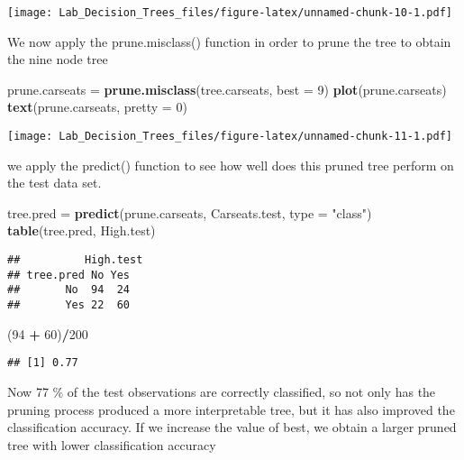 \documentclass[]{article}
\newenvironment{Shaded}{\begin{snugshade}}{\end{snugshade}}
\newcommand{\KeywordTok}[1]{\textcolor[rgb]{0.13,0.29,0.53}{\textbf{#1}}}
\newcommand{\DataTypeTok}[1]{\textcolor[rgb]{0.13,0.29,0.53}{#1}}
\newcommand{\DecValTok}[1]{\textcolor[rgb]{0.00,0.00,0.81}{#1}}
\newcommand{\StringTok}[1]{\textcolor[rgb]{0.31,0.60,0.02}{#1}}
\newcommand{\OperatorTok}[1]{\textcolor[rgb]{0.81,0.36,0.00}{\textbf{#1}}}
\newcommand{\NormalTok}[1]{#1}
\begin{document}
\texttt{[image: Lab\_Decision\_Trees\_files/figure-latex/unnamed-chunk-10-1.pdf]}

We now apply the prune.misclass() function in order to prune the tree to
obtain the nine node tree

\begin{Shaded}
\begin{Highlighting}[]
\NormalTok{prune.carseats =}\StringTok{ }\KeywordTok{prune.misclass}\NormalTok{(tree.carseats, }\DataTypeTok{best =} \DecValTok{9}\NormalTok{)}
\KeywordTok{plot}\NormalTok{(prune.carseats)}
\KeywordTok{text}\NormalTok{(prune.carseats, }\DataTypeTok{pretty =} \DecValTok{0}\NormalTok{)}
\end{Highlighting}
\end{Shaded}

\texttt{[image: Lab\_Decision\_Trees\_files/figure-latex/unnamed-chunk-11-1.pdf]}

we apply the predict() function to see how well does this pruned tree
perform on the test data set.

\begin{Shaded}
\begin{Highlighting}[]
\NormalTok{tree.pred =}\StringTok{ }\KeywordTok{predict}\NormalTok{(prune.carseats, Carseats.test, }\DataTypeTok{type =} \StringTok{"class"}\NormalTok{)}
\KeywordTok{table}\NormalTok{(tree.pred, High.test)}
\end{Highlighting}
\end{Shaded}

\begin{verbatim}
##          High.test
## tree.pred No Yes
##       No  94  24
##       Yes 22  60
\end{verbatim}

\begin{Shaded}
\begin{Highlighting}[]
\NormalTok{(}\DecValTok{94} \OperatorTok{+}\StringTok{ }\DecValTok{60}\NormalTok{)}\OperatorTok{/}\DecValTok{200}
\end{Highlighting}
\end{Shaded}

\begin{verbatim}
## [1] 0.77
\end{verbatim}

Now 77 \% of the test observations are correctly classified, so not only
has the pruning process produced a more interpretable tree, but it has
also improved the classification accuracy. If we increase the value of
best, we obtain a larger pruned tree with lower classification accuracy
\end{document}
